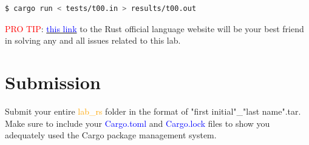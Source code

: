 \documentclass[11pt]{article}
\begin{document}
\begin{lstlisting}[language=bash, keywordstyle=\color{black}]
$ cargo run < tests/t00.in > results/t00.out
\end{lstlisting}
\bigskip
\textcolor{red}{PRO TIP}: \href{https://www.rust-lang.org/}{\textcolor{blue}{this link}} to the Rust official language website will be your best friend in solving any and all issues related to this lab.

\newpage

\section*{Submission}
Submit your entire \textcolor{orange}{lab\_rs} folder in the format of "first initial"\_"last name".tar. Make sure to include your \textcolor{blue}{Cargo.toml} and \textcolor{blue}{Cargo.lock} files to show you adequately used the Cargo package management system.

\bigskip\bigskip
\end{document}

